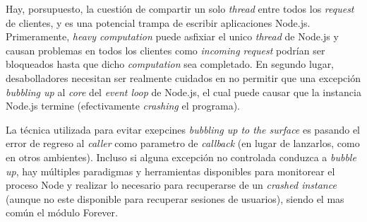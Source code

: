 Hay, porsupuesto, la cuestión de compartir un solo \textit{thread} entre todos los \textit{request} de clientes, y es una potencial trampa de escribir aplicaciones Node.js. Primeramente, \textit{heavy computation} puede asfixiar el unico \textit{thread} de Node.js y causan problemas en todos los clientes como \textit{incoming request} podrían ser bloqueados hasta que dicho \textit{computation} sea completado. En segundo lugar, desabolladores necesitan ser realmente cuidados en no permitir que una excepción \textit{bubbling up} al \textit{core} del \textit{event loop} de Node.js, el cual puede causar que la instancia Node.js termine (efectivamente \textit{crashing} el programa).

La técnica utilizada para evitar exepcines \textit{bubbling up to the surface} es pasando el error de regreso al \textit{caller} como parametro de \textit{callback} (en lugar de lanzarlos, como en otros ambientes). Incluso si alguna excepción no controlada conduzca a \textit{bubble up}, hay múltiples paradigmas y herramientas disponibles para monitorear el proceso Node y realizar lo necesario para recuperarse de un \textit{crashed instance} (aunque no este disponible para recuperar sesiones de usuarios), siendo el mas común el módulo Forever\cite{online_github_nodejitsu_forever}.



